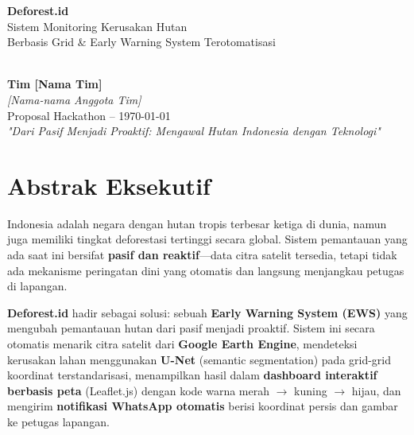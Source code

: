 \documentclass[11pt,a4paper]{article}
\begin{document}
\begin{titlepage}
    \centering
    \vspace*{2cm}

    {\Huge\bfseries\color{forestgreen} Deforest.id}\\[0.5cm]
    {\Large\color{darkearth} Sistem Monitoring Kerusakan Hutan\\Berbasis Grid \& Early Warning System Terotomatisasi}\\[1cm]

    \\[1cm]

    {\large\textbf{Tim [Nama Tim]}}\\[0.3cm]
    {\large\textit{[Nama-nama Anggota Tim]}}\\[0.5cm]

    \vfill
    {\small Proposal Hackathon -- \today}\\[0.3cm]
    {\small\textit{"Dari Pasif Menjadi Proaktif: Mengawal Hutan Indonesia dengan Teknologi"}}
\end{titlepage}

\newpage
\tableofcontents
\newpage

\section{Abstrak Eksekutif}

Indonesia adalah negara dengan hutan tropis terbesar ketiga di dunia, namun juga memiliki tingkat deforestasi tertinggi secara global. Sistem pemantauan yang ada saat ini bersifat \textbf{pasif dan reaktif}---data citra satelit tersedia, tetapi tidak ada mekanisme peringatan dini yang otomatis dan langsung menjangkau petugas di lapangan.

\textbf{Deforest.id} hadir sebagai solusi: sebuah \textbf{Early Warning System (EWS)} yang mengubah pemantauan hutan dari pasif menjadi proaktif. Sistem ini secara otomatis menarik citra satelit dari \textbf{Google Earth Engine}, mendeteksi kerusakan lahan menggunakan \textbf{U-Net} (semantic segmentation) pada grid-grid koordinat terstandarisasi, menampilkan hasil dalam \textbf{dashboard interaktif berbasis peta} (Leaflet.js) dengan kode warna merah $\to$ kuning $\to$ hijau, dan mengirim \textbf{notifikasi WhatsApp otomatis} berisi koordinat persis dan gambar ke petugas lapangan.
\end{document}
